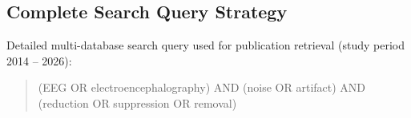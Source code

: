 \subsection{Complete Search Query Strategy}
\label{sec:complete_query}
Detailed multi-database search query used for publication retrieval (study period 2014 -- 2026):

\begin{quote}
\small\ttfamily\raggedright
(EEG OR electroencephalography) AND (noise OR artifact) AND (reduction OR suppression OR removal)
\end{quote}